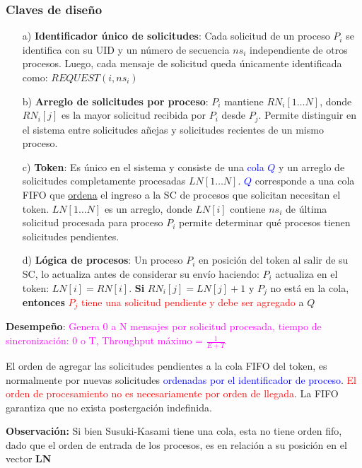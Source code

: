 \subsubsection{Claves de diseño}
\begin{itemize}
    \item[a)] \textbf{Identificador único de solicitudes}: Cada solicitud de un proceso $P_i$ se identifica con su UID y un número de secuencia $ns_i$ independiente de otros procesos. Luego, cada mensaje de solicitud queda únicamente identificada como: $REQUEST(i, ns_i)$
    \item[b)] \textbf{Arreglo de solicitudes por proceso}: $P_i$ mantiene $RN_i[1\ldots N]$, donde $RN_i[j]$ es la mayor solicitud recibida por $P_i$ desde $P_j$. Permite distinguir en el sistema entre solicitudes a\~{n}ejas y solicitudes recientes de un mismo proceso.
    \item[c)] \textbf{Token}: Es único en el sistema y consiste de una \textcolor{blue}{cola $Q$} y un arreglo de solicitudes completamente procesadas $LN[1 \ldots N]$. \textcolor{blue}{$Q$} corresponde a una cola FIFO que \underline{ordena} el ingreso a la SC de procesos que solicitan necesitan el token.  $LN[1 \ldots N]$ es un arreglo, donde $LN[i]$ contiene $ns_i$ de última solicitud procesada para proceso $P_i$  permite determinar qué procesos tienen solicitudes pendientes.
    \item[d)] \textbf{Lógica de procesos}: Un proceso $P_i$ en posición del token al salir de su SC, lo actualiza antes de considerar su envío haciendo: $P_i$ actualiza en el token: $LN[i] = RN[i]$. \textbf{Si} $RN_i[j] = LN[j] + 1$ y $P_j$ no está en la cola, \textbf{entonces} \textcolor{red}{$P_j$ tiene una solicitud pendiente y debe ser agregado }a $Q$
\end{itemize}

\textbf{Desempeño}: \textcolor{magenta}{Genera 0 a N mensajes por solicitud procesada, tiempo de sincronización: 0 o T, Throughput máximo = $\frac{1}{E+T}$}

El orden de agregar las solicitudes pendientes a la cola FIFO del token, es normalmente por nuevas solicitudes \textcolor{blue}{ordenadas por el identificador de proceso}. \textcolor{red}{El orden de procesamiento no es necesariamente por orden de llegada}. La FIFO garantiza que no exista postergación indefinida. 

\textbf{Observación:} Si bien Susuki-Kasami tiene una cola, esta no tiene orden fifo, dado que el orden de entrada de los procesos, es en relación a su posición en el vector \textbf{LN}